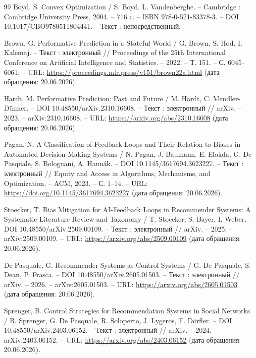 \begin{thebibliography}{99}
Boyd, S. Convex Optimization / S. Boyd, L. Vandenberghe. -- Cambridge : Cambridge University Press, 2004. -- 716 с. -- ISBN 978-0-521-83378-3. -- DOI 10.1017/CBO9780511804441. -- Текст : непосредственный.

Brown, G. Performative Prediction in a Stateful World / G. Brown, S. Hod, I. Kalemaj. -- Текст : электронный // Proceedings of the 25th International Conference on Artificial Intelligence and Statistics. -- 2022. -- Т. 151. -- С. 6045--6061. -- URL: \url{https://proceedings.mlr.press/v151/brown22a.html} (дата обращения: 20.06.2026).

Hardt, M. Performative Prediction: Past and Future / M. Hardt, C. Mendler-Dünner. -- DOI 10.48550/arXiv.2310.16608. -- Текст : электронный // arXiv. -- 2023. -- arXiv:2310.16608. -- URL: \url{https://arxiv.org/abs/2310.16608} (дата обращения: 20.06.2026).

Pagan, N. A Classification of Feedback Loops and Their Relation to Biases in Automated Decision-Making Systems / N. Pagan, J. Baumann, E. Elokda, G. De Pasquale, S. Bolognani, A. Hannák. -- DOI 10.1145/3617694.3623227. -- Текст : электронный // Equity and Access in Algorithms, Mechanisms, and Optimization. -- ACM, 2023. -- С. 1--14. -- URL: \url{https://doi.org/10.1145/3617694.3623227} (дата обращения: 20.06.2026).

Stoecker, T. Bias Mitigation for AI-Feedback Loops in Recommender Systems: A Systematic Literature Review and Taxonomy / T. Stoecker, S. Bayer, I. Weber. -- DOI 10.48550/arXiv.2509.00109. -- Текст : электронный // arXiv. -- 2025. -- arXiv:2509.00109. -- URL: \url{https://arxiv.org/abs/2509.00109} (дата обращения: 20.06.2026).

De Pasquale, G. Recommender Systems as Control Systems / G. De Pasquale, S. Dean, P. Frasca. -- DOI 10.48550/arXiv.2605.01503. -- Текст : электронный // arXiv. -- 2026. -- arXiv:2605.01503. -- URL: \url{https://arxiv.org/abs/2605.01503} (дата обращения: 20.06.2026).

Sprenger, B. Control Strategies for Recommendation Systems in Social Networks / B. Sprenger, G. De Pasquale, R. Soloperto, J. Lygeros, F. Dörfler. -- DOI 10.48550/arXiv.2403.06152. -- Текст : электронный // arXiv. -- 2024. -- arXiv:2403.06152. -- URL: \url{https://arxiv.org/abs/2403.06152} (дата обращения: 20.06.2026).


\end{thebibliography}

